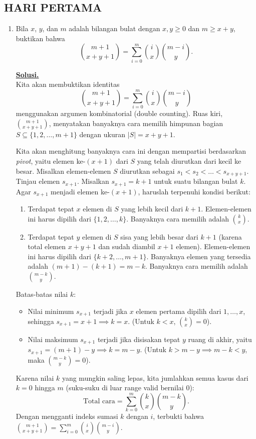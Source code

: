 \documentclass[12pt,twoside]{article}
\newenvironment{solution}
{
	\par\noindent\textbf{\underline{Solusi.}}\\
}
{
	\par
}
\begin{document}
\subsection{HARI PERTAMA}
\begin{enumerate}
  \item Bila $x$, $y$, dan $m$ adalah bilangan bulat dengan $x, y \geq 0$ dan $m \geq x + y$, buktikan bahwa
        \[
          \binom{m + 1}{x + y + 1} = \sum_{i = 0}^{m} \binom{i}{x} \binom{m - i}{y}.
        \]

        \begin{solution}
          Kita akan membuktikan identitas
          \[ \binom{m + 1}{x + y + 1} = \sum_{i = 0}^{m} \binom{i}{x} \binom{m - i}{y} \]
          menggunakan argumen kombinatorial (double counting).
          Ruas kiri, $\binom{m+1}{x+y+1}$, menyatakan banyaknya cara memilih himpunan bagian $S \subseteq \{1, 2, \dots, m+1\}$ dengan ukuran $|S| = x+y+1$.

          Kita akan menghitung banyaknya cara ini dengan mempartisi berdasarkan \textit{pivot}, yaitu elemen ke-$(x+1)$ dari $S$ yang telah diurutkan dari kecil ke besar.
          Misalkan elemen-elemen $S$ diurutkan sebagai $s_1 < s_2 < \dots < s_{x+y+1}$.
          Tinjau elemen $s_{x+1}$. Misalkan $s_{x+1} = k + 1$ untuk suatu bilangan bulat $k$.
          Agar $s_{x+1}$ menjadi elemen ke-$(x+1)$, haruslah terpenuhi kondisi berikut:
          \begin{enumerate}
            \item Terdapat tepat $x$ elemen di $S$ yang lebih kecil dari $k+1$. Elemen-elemen ini harus dipilih dari $\{1, 2, \dots, k\}$. Banyaknya cara memilih adalah $\binom{k}{x}$.
            \item Terdapat tepat $y$ elemen di $S$ sisa yang lebih besar dari $k+1$ (karena total elemen $x+y+1$ dan sudah diambil $x+1$ elemen). Elemen-elemen ini harus dipilih dari $\{k+2, \dots, m+1\}$. Banyaknya elemen yang tersedia adalah $(m+1) - (k+1) = m - k$. Banyaknya cara memilih adalah $\binom{m-k}{y}$.
          \end{enumerate}
          Batas-batas nilai $k$:
          \begin{itemize}
            \item Nilai minimum $s_{x+1}$ terjadi jika $x$ elemen pertama dipilih dari $1, \dots, x$, sehingga $s_{x+1} = x+1 \implies k = x$. (Untuk $k < x$, $\binom{k}{x} = 0$).
            \item Nilai maksimum $s_{x+1}$ terjadi jika disisakan tepat $y$ ruang di akhir, yaitu $s_{x+1} = (m+1) - y \implies k = m - y$. (Untuk $k > m-y \implies m-k < y$, maka $\binom{m-k}{y} = 0$).
          \end{itemize}
          Karena nilai $k$ yang mungkin saling lepas, kita jumlahkan semua kasus dari $k=0$ hingga $m$ (suku-suku di luar range valid bernilai 0):
          \[ \text{Total cara} = \sum_{k=0}^{m} \binom{k}{x} \binom{m - k}{y}. \]
          Dengan mengganti indeks sumasi $k$ dengan $i$, terbukti bahwa $\binom{m+1}{x+y+1} = \sum_{i=0}^{m} \binom{i}{x} \binom{m-i}{y}$.
        \end{solution}


\end{enumerate}
\end{document}
